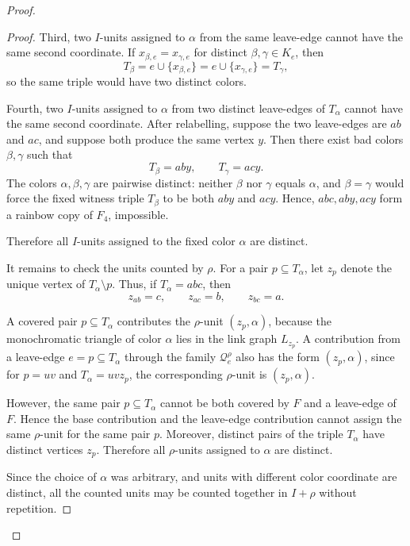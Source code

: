 \documentclass[10pt,a4paper]{amsart}
\begin{document}
\begin{proof}
\begin{proof}
        Third, two $I$-units assigned to $\alpha$ from the same leave-edge
        cannot have the same second coordinate.  If
        $x_{\beta,e}=x_{\gamma,e}$ for distinct $\beta,\gamma\in K_e$, then
        \[
            T_\beta=e\cup\{x_{\beta,e}\}
            =
            e\cup\{x_{\gamma,e}\}
            =
            T_\gamma,
        \]
        so the same triple would have two distinct colors.

        Fourth, two $I$-units assigned to $\alpha$ from two distinct
        leave-edges of $T_\alpha$ cannot have the same second coordinate.
        After relabelling, suppose the two leave-edges are $ab$ and $ac$, and
        suppose both produce the same vertex $y$.  Then there exist bad colors
        $\beta,\gamma$ such that
        \[
            T_\beta=aby,
            \qquad
            T_\gamma=acy.
        \]
        The colors $\alpha,\beta,\gamma$ are pairwise distinct: neither
        $\beta$ nor $\gamma$ equals $\alpha$, and $\beta=\gamma$ would force
        the fixed witness triple $T_\beta$ to be both $aby$ and $acy$.
        Hence, $abc,aby,acy$ form a rainbow copy of $F_4$, impossible.

        Therefore all $I$-units assigned to the fixed color $\alpha$ are
        distinct.

        It remains to check the units counted by $\rho$.  For a pair
        $p\subseteq T_\alpha$, let $z_p$ denote the unique vertex of $T_\alpha\setminus p$.
        Thus, if $T_\alpha=abc$, then
        \[
            z_{ab}=c,\qquad z_{ac}=b,\qquad z_{bc}=a.
        \]

        A covered pair $p\subseteq T_\alpha$ contributes the $\rho$-unit $(z_p,\alpha)$,
        because the monochromatic triangle of color $\alpha$ lies in the link graph $L_{z_p}$.
        A contribution from a leave-edge
        $e=p\subseteq T_\alpha$ through the family $\mathcal Q_e^\rho$ also
        has the form $(z_p,\alpha)$,
        since for $p=uv$ and $T_\alpha=uvz_p$, the corresponding
        $\rho$-unit is $(z_p,\alpha)$.

        However, the same pair $p\subseteq T_\alpha$ cannot be both covered by
        $F$ and a leave-edge of $F$.  Hence the base contribution and the
        leave-edge contribution cannot assign the same $\rho$-unit for the
        same pair $p$.  Moreover, distinct pairs of the triple $T_\alpha$ have
        distinct vertices $z_p$.  Therefore all $\rho$-units assigned to
        $\alpha$ are distinct.

        Since the choice of $\alpha$ was arbitrary, and units with different
        color coordinate are distinct, all the counted units may be counted
        together in $I+\rho$ without repetition.
    \end{proof}


\end{proof}
\end{document}
